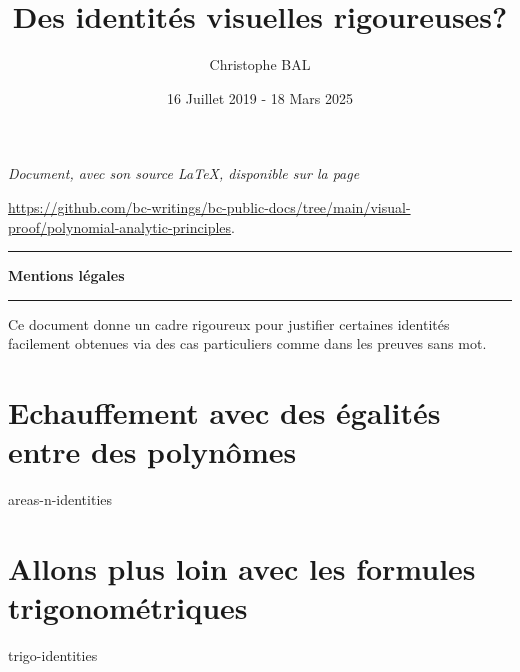 \documentclass[12pt]{amsart}
\begin{document}
\title{Des identités {\og visuelles \fg} rigoureuses?}
\author{Christophe BAL}
\date{16 Juillet 2019 - 18 Mars 2025}

\maketitle

\begin{center}
	\itshape
	Document, avec son source \LaTeX, disponible sur la page

	\url{https://github.com/bc-writings/bc-public-docs/tree/main/visual-proof/polynomial-analytic-principles}.
\end{center}


\bigskip


\begin{center}
	\hrule\vspace{.3em}
	{
		\fontsize{1.35em}{1em}\selectfont
		\textbf{Mentions \og légales \fg}
	}

	\vspace{0.45em}
	\doclicenseThis
	\hrule
\end{center}


\bigskip


\setcounter{tocdepth}{1}
\tableofcontents



\newpage

\begin{meta-abstract*}
	Ce document donne un cadre rigoureux pour justifier certaines identités facilement obtenues via des cas particuliers  comme dans les preuves sans mot. 
\end{meta-abstract*}


\section{Echauffement avec des égalités entre des polynômes}

{areas-n-identities}



\newpage

\section{Allons plus loin avec les formules trigonométriques}

{trigo-identities}
\end{document}
